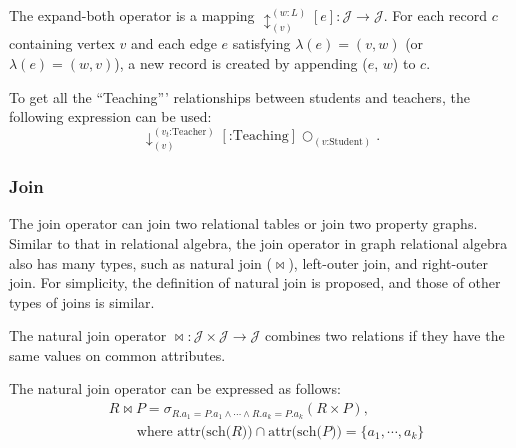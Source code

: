 \begin{definition}
    The expand-both operator is a mapping $\updownarrow_{(v)}^{(w:L)}[e] : \mathcal{J} \rightarrow \mathcal{J}$.
    For each record $c$ containing vertex $v$ and each edge $e$ satisfying $\lambda(e) = (v, w)$ (or $\lambda(e) = (w, v)$), a new record is created by appending ($e$, $w$) to $c$.
\end{definition}

\begin{example}
    To get all the ``Teaching''' relationships between students and teachers, the following expression can be used:
    \begin{equation*}
        \downarrow_{(v)}^{(v_t\text{:Teacher})}[\text{:Teaching}]\bigcirc_{(v\text{:Student})}.
    \end{equation*}
\end{example}

\subsubsection{Join}

The join operator can join two relational tables or join two property graphs.
Similar to that in relational algebra, the join operator in graph relational algebra also has many types, such as natural join ($\Join$), left-outer join, and right-outer join.
For simplicity, the definition of natural join is proposed, and those of other types of joins is similar.

\begin{definition}
    The natural join operator $\Join : \mathcal{J} \times \mathcal{J} \rightarrow \mathcal{J}$ combines two relations if they have the same values on common attributes.
\end{definition}

The natural join operator can be expressed as follows:
\begin{equation*}
    \begin{split}
        & R \Join P = \sigma_{R.a_1 = P.a_1 \land \cdots \land R.a_k = P.a_k}(R \times P), \\
        & \hspace{2em} \text{where } \text{attr(sch($R$))} \cap \text{attr(sch($P$))} = \{a_1, \cdots, a_k\}
    \end{split}
\end{equation*}

